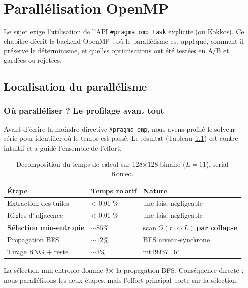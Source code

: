 \chapter{Parallélisation OpenMP}
\label{chap:openmp}

Le sujet exige l'utilisation de l'API \texttt{\#pragma omp task} explicite (ou Kokkos). Ce chapitre décrit le backend OpenMP : où le parallélisme est appliqué, comment il préserve le déterminisme, et quelles optimisations ont été testées en A/B et gardées ou rejetées.

\section{Localisation du parallélisme}

\subsection{Où paralléliser ? Le profilage avant tout}

Avant d'écrire la moindre directive \texttt{\#pragma omp}, nous avons profilé le solveur série pour identifier où le temps est passé. Le résultat (Tableau~\ref{tab:profiling}) est contre-intuitif et a guidé l'ensemble de l'effort.

\begin{table}[H]
\centering
\begin{tabular}{lll}
\toprule
\textbf{Étape} & \textbf{Temps relatif} & \textbf{Nature} \\
\midrule
Extraction des tuiles & < 0.01 \% & une fois, négligeable \\
Règles d'adjacence & < 0.01 \% & une fois, négligeable \\
\textbf{Sélection min-entropie} & \textbf{$\sim 85\%$} & scan $O(r \cdot c \cdot L)$ \textbf{par collapse} \\
Propagation BFS & $\sim 12\%$ & BFS niveau-synchrone \\
Tirage RNG + reste & $\sim 3\%$ & mt19937\_64 \\
\bottomrule
\end{tabular}
\caption{Décomposition du temps de calcul sur 128×128 binaire ($L=11$), serial Romeo.}
\label{tab:profiling}
\end{table}

La sélection min-entropie domine 8× la propagation BFS. Conséquence directe : nous parallélisons les deux étapes, mais l'effort principal porte sur la sélection.

